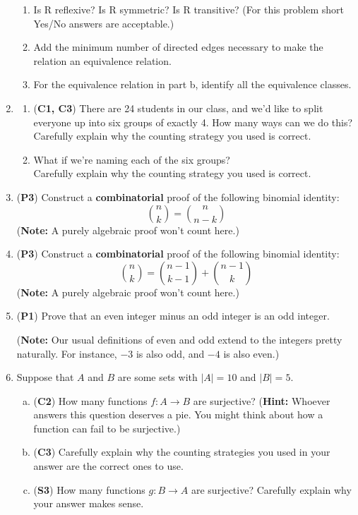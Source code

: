 \documentclass[12pt]{article}
\begin{document}
\begin{enumerate}
\begin{enumerate}
    \item Is R reflexive? Is R symmetric? Is R transitive? (For this problem short Yes/No answers are acceptable.)
    \item Add the minimum number of directed edges necessary to make the relation an equivalence relation.
    \item For the equivalence relation in part b, identify all the equivalence classes.
\end{enumerate}

\item 
\begin{enumerate} 
\item (\textbf{C1, C3}) There are 24 students in our class, and we'd like to split everyone up into six groups of exactly 4. How many ways can we do this?\\
Carefully explain why the counting strategy you used is correct.
\item What if we're naming each of the six groups?\\
Carefully explain why the counting strategy you used is correct.
\end{enumerate}

\item (\textbf{P3}) Construct a \textbf{combinatorial} proof of the following binomial identity: 
\[\binom{n}{k} = \binom{n}{n-k}\]
(\textbf{Note:} A purely algebraic proof won't count here.)

\item (\textbf{P3}) Construct a \textbf{combinatorial} proof of the following binomial identity: 
\[\binom{n}{k} = \binom{n-1}{k-1} + \binom{n-1}{k}\]
(\textbf{Note:} A purely algebraic proof won't count here.)

\item (\textbf{P1}) Prove that an even integer minus an odd integer is an odd integer. 

(\textbf{Note:} Our usual definitions of even and odd extend to the integers pretty naturally. For instance, $-3$ is also odd, and $-4$ is also even.)

\item Suppose that $A$ and $B$ are some sets with $|A| = 10$ and $|B| = 5$.
\begin{enumerate}[(a)]
    \item (\textbf{C2}) How many functions $f:A\to B$ are surjective? (\textbf{Hint:} Whoever answers this question deserves a pie. You might think about how a function can fail to be surjective.)
    \item (\textbf{C3}) Carefully explain why the counting strategies you used in your answer are the correct ones to use.
    \item (\textbf{S3}) How many functions $g:B \to A$ are surjective? Carefully explain why your answer makes sense.
\end{enumerate}


\end{enumerate}
\end{document}
